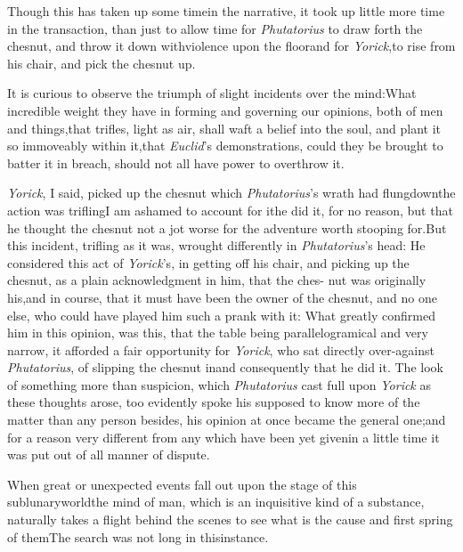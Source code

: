 \documentclass[twoside]{article}
\begin{document}
Though this has taken up some time\break in the narrative, it took up
little more time in the transaction, than just to allow time for
\textit{Phutatorius} to draw forth the chesnut, and throw it down
with\break violence upon the floor\tsk and for
\textit{Yorick},\break to rise
from his chair, and pick the chesnut up.

It is curious to observe the triumph of slight incidents over
the mind:\tsh What incredible weight they have in forming
and governing our opinions, both of men and things,\tsk that
trifles, light as air, shall waft a belief into the soul,
and plant it so immoveably within it,\tsk that
\textit{Euclid}’s demonstrations, could they be brought to
batter it in breach, should not all have power to overthrow
it.

\textit{Yorick}, I said, picked up the chesnut which
\textit{Phutatorius}’s wrath had flung\break down\tsk the action
was trifling\tsk I am ashamed to account for it\tsk he did
it,\break
for no reason, but that he thought the chesnut not a jot
worse for the adventure\tsk {}
worth stooping for.\tsk But this incident, trifling as it
was, wrought differently in \textit{Phutatorius}’s head: He
considered this act of \textit{Yorick}’s, in getting off his
chair, and picking up the chesnut, as a plain acknowledgment
in him, that the ches- nut was originally his,\tsk and in
course, that it must have been the owner of the chesnut, and
no one else, who could have played him such a prank with it:\break
What greatly confirmed him in this opinion, was this, that
the table being pa\-rallelogramical and very narrow, it
afforded a fair opportunity for \textit{Yorick},\break
who sat directly over-against \textit{Phutatorius},\break
of slipping the chesnut in\tsk and consequently that he did it. The look of
something more than suspicion, which \textit{Phutatorius}
cast full upon \textit{Yorick} as these thoughts arose, too
evidently spoke his 
supposed to know more of the matter than any
person besides, his opinion at once became the general
one;\tsh and for a reason very different from any which have
been yet given\tsh\enlargethispage\baselineskip in a little time it was put out of all
manner of dispute.

When great or unexpected events fall out upon the stage of this
sublunary\break world\tsk the mind of man, which is an
inquisitive kind of a substance, naturally takes a flight behind
the scenes to see what is the cause and first spring
of\break
them\tsk The search was not long in this\break instance.
\end{document}
